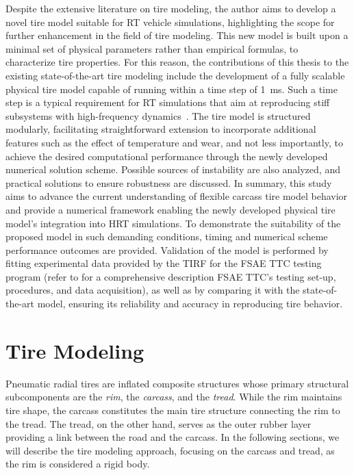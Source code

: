 Despite the extensive literature on tire modeling, the author aims to develop a novel tire model suitable for \ac{RT} vehicle simulations, highlighting the scope for further enhancement in the field of tire modeling. This new model is built upon a minimal set of physical parameters rather than empirical formulas, to characterize tire properties. For this reason, the contributions of this thesis to the existing state-of-the-art tire modeling include the development of a fully scalable physical tire model capable of running within a time step of \SI{1}{\milli\second}. Such a time step is a typical requirement for \ac{RT} simulations that aim at reproducing stiff subsystems with high-frequency dynamics~\cite{pacejka2012tire}. The tire model is structured modularly, facilitating straightforward extension to incorporate additional features such as the effect of temperature and wear, and not less importantly, to achieve the desired computational performance through the newly developed numerical solution scheme. Possible sources of instability are also analyzed, and practical solutions to ensure robustness are discussed. In summary, this study aims to advance the current understanding of flexible carcass tire model behavior and provide a numerical framework enabling the newly developed physical tire model's integration into \ac{HRT} simulations. To demonstrate the suitability of the proposed model in such demanding conditions, timing and numerical scheme performance outcomes are provided. Validation of the model is performed by fitting experimental data provided by the \ac{TIRF} for the \ac{FSAE} \ac{TTC} testing program (refer to \citet{kasprzak2006formula} for a comprehensive description \ac{FSAE} \ac{TTC}'s testing set-up, procedures, and data acquisition), as well as by comparing it with the state-of-the-art \MagicFormulae{} model, ensuring its reliability and accuracy in reproducing tire behavior.


\section{Tire Modeling}
\label{app3:sec:tire_modeling}

Pneumatic radial tires are inflated composite structures whose primary structural subcomponents are the \emph{rim}, the \emph{carcass}, and the \emph{tread}. While the rim maintains tire shape, the carcass constitutes the main tire structure connecting the rim to the tread. The tread, on the other hand, serves as the outer rubber layer providing a link between the road and the carcass. In the following sections, we will describe the tire modeling approach, focusing on the carcass and tread, as the rim is considered a rigid body.

